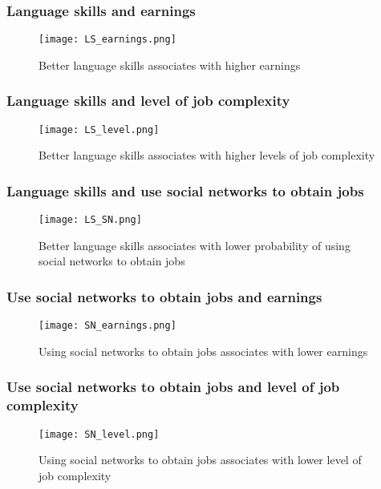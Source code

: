 \documentclass{beamer}
\begin{document}
\begin{frame}
\frametitle{Language skills and earnings}

\begin{figure}
\centering
\texttt{[image: LS\_earnings.png]}
  \caption*{Better language skills associates with higher earnings}
\end{figure}

\end{frame}


\begin{frame}
\frametitle{Language skills and level of job complexity}

\begin{figure}
\centering
\texttt{[image: LS\_level.png]}
  \caption*{Better language skills associates with higher levels of job complexity}
\end{figure}

\end{frame}


\begin{frame}
\frametitle{Language skills and use social networks to obtain jobs}

\begin{figure}
\centering
\texttt{[image: LS\_SN.png]}
  \caption*{Better language skills associates with lower probability of using social networks to obtain jobs}
\end{figure}

\end{frame}


\begin{frame}
\frametitle{Use social networks to obtain jobs and earnings}

\begin{figure}
\centering
\texttt{[image: SN\_earnings.png]}
  \caption*{Using social networks to obtain jobs associates with lower earnings}
\end{figure}

\end{frame}


\begin{frame}
\frametitle{Use social networks to obtain jobs and level of job complexity}

\begin{figure}
\centering
\texttt{[image: SN\_level.png]}
  \caption*{Using social networks to obtain jobs associates with lower level of job complexity}
\end{figure}

\end{frame}
\end{document}
